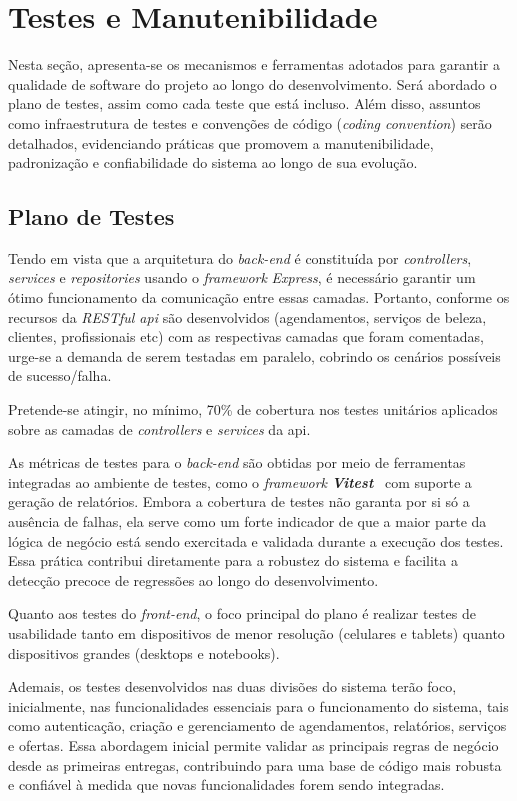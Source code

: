 \section{Testes e Manutenibilidade}
Nesta seção, apresenta-se os mecanismos e ferramentas adotados para garantir a qualidade de software do projeto ao longo do desenvolvimento.
Será abordado o plano de testes, assim como cada teste que está incluso. Além disso, assuntos como infraestrutura de testes e convenções de código (\textit{coding convention})
serão detalhados, evidenciando práticas que promovem a manutenibilidade, padronização e confiabilidade do sistema ao longo de sua evolução.

\subsection{Plano de Testes}
Tendo em vista que a arquitetura do \textit{back-end} é constituída por \textit{controllers}, \textit{services} e \textit{repositories} usando o \emph{framework} \textit{Express}, 
é necessário garantir um ótimo funcionamento da comunicação entre essas camadas. Portanto, conforme os recursos da \textit{RESTful \gls{api}} são desenvolvidos (agendamentos, serviços de beleza, clientes, profissionais etc) com as respectivas camadas que foram comentadas, urge-se a demanda de serem testadas em paralelo, cobrindo os cenários possíveis de sucesso/falha. 

Pretende-se atingir, no mínimo, 70\% de cobertura nos testes unitários aplicados sobre as camadas de \textit{controllers} e \textit{services} da \gls{api}. 

As métricas de testes para o \textit{back-end} são obtidas por meio de ferramentas integradas ao ambiente de testes, como o \textit{framework} \textbf{\textit{Vitest}}~\cite{vitest-2025} com suporte a geração de relatórios. Embora a cobertura de testes não garanta por si só a ausência de falhas, ela serve como um forte indicador de que a maior parte da lógica de negócio está sendo exercitada e validada durante a execução dos testes. Essa prática contribui diretamente para a robustez do sistema e facilita a detecção precoce de regressões ao longo do desenvolvimento.

Quanto aos testes do \textit{front-end}, o foco principal do plano é realizar testes de usabilidade tanto em dispositivos de menor resolução (celulares e tablets) quanto dispositivos grandes (desktops e notebooks). 

Ademais, os testes desenvolvidos nas duas divisões do sistema terão foco, inicialmente, nas funcionalidades essenciais para o funcionamento do sistema, tais como autenticação, criação e gerenciamento de agendamentos, relatórios, serviços e ofertas. Essa abordagem inicial permite validar as principais regras de negócio desde as primeiras entregas, contribuindo para uma base de código mais robusta e confiável à medida que novas funcionalidades forem sendo integradas.

